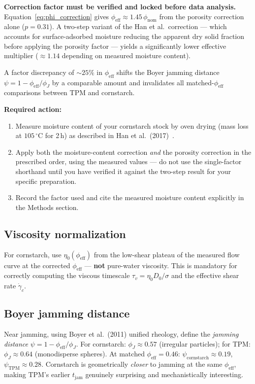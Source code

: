 \documentclass[11pt,letterpaper]{article}
\newcommand{\phieff}{\phi_{\mathrm{eff}}}
\newcommand{\phinom}{\phi_{\mathrm{nom}}}
\newcommand{\phiJ}{\phi_{J}}
\newcommand{\tjam}{t_{\mathrm{jam}}}
\newcommand{\gamcrit}{\dot{\gamma}_c}
\begin{document}
\begin{cautionbox}
\textbf{Correction factor must be verified and locked before data analysis.}
Equation~\eqref{eq:phi_correction} gives $\phieff \approx 1.45\,\phinom$ from the
porosity correction alone ($p = 0.31$). A two-step variant of the Han et al.\
correction --- which accounts for surface-adsorbed moisture reducing the
apparent dry solid fraction before applying the porosity factor --- yields a
significantly lower effective multiplier (${\approx}1.14$ depending on measured
moisture content).

A factor discrepancy of ${\sim}25\%$ in $\phieff$ shifts the Boyer jamming distance
$\psi = 1 - \phieff/\phiJ$ by a comparable amount and invalidates all matched-$\phieff$
comparisons between TPM and cornstarch.

\noindent \textbf{Required action:}
\begin{enumerate}[noitemsep,topsep=3pt]
  \item Measure moisture content of your cornstarch stock by oven drying (mass loss
    at $105\,^\circ$C for 2\,h) as described in Han et al.\ (2017)~\cite{HanVanHa2017}.
  \item Apply both the moisture-content correction \emph{and} the porosity correction
    in the prescribed order, using the measured values --- do not use the single-factor
    shorthand until you have verified it against the two-step result for your specific
    preparation.
  \item Record the factor used and cite the measured moisture content explicitly in
    the Methods section.
\end{enumerate}
\end{cautionbox}

\subsection{Viscosity normalization}

For cornstarch, use $\eta_0(\phieff)$ from the low-shear plateau of the
measured flow curve at the corrected $\phieff$ --- \textbf{not} pure-water
viscosity. This is mandatory for correctly computing the viscous timescale
$\tau_v = \eta_0 D_0 / \sigma$ and the effective shear rate $\gamcrit$.

\subsection{Boyer jamming distance}

Near jamming, using Boyer et al.\ (2011) \cite{Boyer2011} unified rheology,
define the \emph{jamming distance} $\psi = 1 - \phieff/\phiJ$.
For cornstarch: $\phiJ \approx 0.57$ (irregular particles);
for TPM: $\phiJ \approx 0.64$ (monodisperse spheres). At matched $\phieff = 0.46$:
$\psi_\mathrm{cornstarch} \approx 0.19$, $\psi_\mathrm{TPM} \approx 0.28$.
Cornstarch is geometrically \emph{closer} to jamming at the same $\phieff$,
making TPM's earlier $\tjam$ genuinely surprising and mechanistically
interesting.
\end{document}
